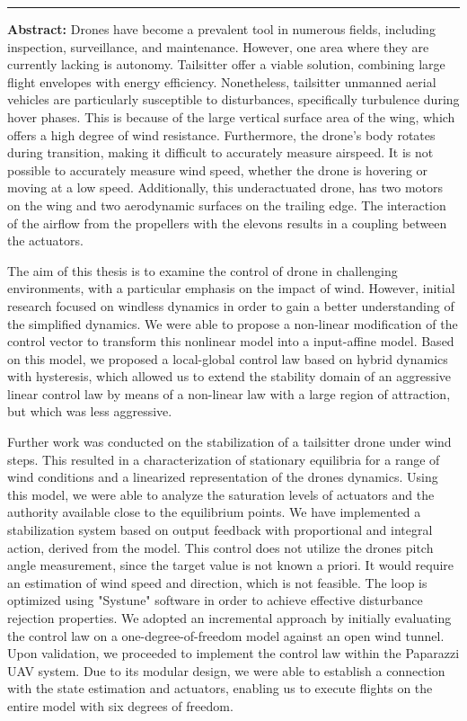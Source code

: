 \newpage
\begin{vcenterpage}
\noindent\rule[2pt]{\textwidth}{0.5pt}

{\large\textbf{Abstract:}}
Drones have become a prevalent tool in numerous fields, including inspection, surveillance, and maintenance. However, one area where they are currently lacking is autonomy. Tailsitter offer a viable solution, combining large flight envelopes with energy efficiency. Nonetheless, tailsitter unmanned aerial vehicles are particularly susceptible to disturbances, specifically turbulence during hover phases. This is because of the large vertical surface area of the wing, which offers a high degree of wind resistance. Furthermore, the drone's body rotates during transition, making it difficult to accurately measure airspeed. It is not possible to accurately measure wind speed, whether the drone is hovering or moving at a low speed. Additionally, this underactuated drone, has two motors on the wing and two aerodynamic surfaces on the trailing edge. The interaction of the airflow from the propellers with the elevons results in a coupling between the actuators.

The aim of this thesis is to examine the control of drone in challenging environments, with a particular emphasis on the impact of wind. However, initial research focused on windless dynamics in order to gain a better understanding of the simplified dynamics. We were able to propose a non-linear modification of the control vector to transform this nonlinear model into a input-affine model. Based on this model, we proposed a local-global control law based on hybrid dynamics with hysteresis, which allowed us to extend the stability domain of an aggressive linear control law by means of a non-linear law with a large region of attraction, but which was less aggressive. 

Further work was conducted on the stabilization of a tailsitter drone under wind steps. This resulted in a characterization of stationary equilibria for a range of wind conditions and a linearized representation of the drones dynamics. Using this model, we were able to analyze the saturation levels of actuators and the authority available close to the equilibrium points. We have implemented a stabilization system based on output feedback with proportional and integral action, derived from the model. This control does not utilize the drones pitch angle measurement, since the target value is not known a priori. It would require an estimation of wind speed and direction, which is not feasible. The loop is optimized using "Systune" software in order to achieve effective disturbance rejection properties. We adopted an incremental approach by initially evaluating the control law on a one-degree-of-freedom model against an open wind tunnel. Upon validation, we proceeded to implement the control law within the Paparazzi UAV system. Due to its modular design, we were able to establish a connection with the state estimation and actuators, enabling us to execute flights on the entire model with six degrees of freedom. 


\end{vcenterpage}
